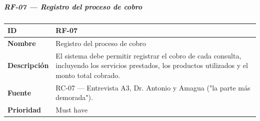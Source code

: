 \subparagraph{RF-07 --- Registro del proceso de
cobro}\label{rf-07-registro-del-proceso-de-cobro}

{\def\LTcaptype{none} %
\begin{longtable}[]{@{}
  >{\raggedright\arraybackslash}p{}
  >{\raggedright\arraybackslash}p{}@{}}
\toprule\noalign{}
\begin{minipage}[b]{\linewidth}\raggedright
\textbf{ID}
\end{minipage} & \begin{minipage}[b]{\linewidth}\raggedright
RF-07
\end{minipage} \\
\midrule\noalign{}
\endhead
\bottomrule\noalign{}
\endlastfoot
\textbf{Nombre} & \begin{minipage}[t]{\linewidth}\raggedright
Registro del proceso de cobro
\end{minipage} \\
\textbf{Descripción} & \begin{minipage}[t]{\linewidth}\raggedright
El sistema debe permitir registrar el cobro de cada consulta, incluyendo
los servicios prestados, los productos utilizados y el monto total
cobrado.
\end{minipage} \\
\textbf{Fuente} & \begin{minipage}[t]{\linewidth}\raggedright
RC-07 --- Entrevista A3, Dr. Antonio y Amagua ("la parte más demorada").
\end{minipage} \\
\textbf{Prioridad} & \begin{minipage}[t]{\linewidth}\raggedright
Must have
\end{minipage} \\
\end{longtable}
}

